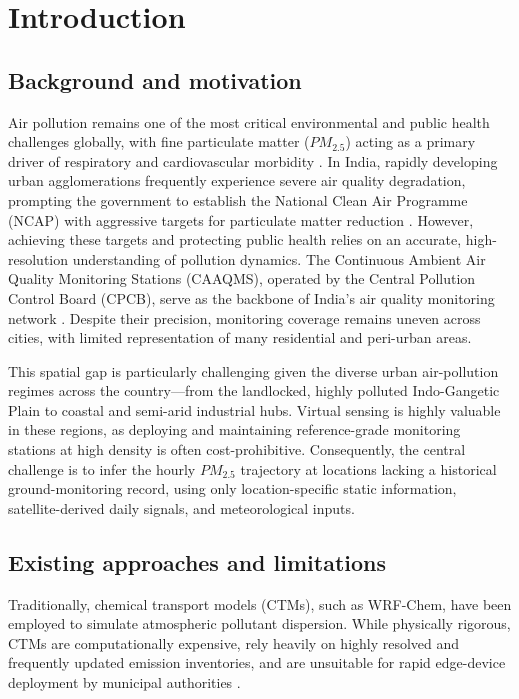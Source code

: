 \section{Introduction}

\subsection{Background and motivation}
Air pollution remains one of the most critical environmental and public health challenges globally, with fine particulate matter ($PM_{2.5}$) acting as a primary driver of respiratory and cardiovascular morbidity \cite{smith2023health, gupta2023india}. In India, rapidly developing urban agglomerations frequently experience severe air quality degradation, prompting the government to establish the National Clean Air Programme (NCAP) with aggressive targets for particulate matter reduction \cite{sharma2023ncap}. However, achieving these targets and protecting public health relies on an accurate, high-resolution understanding of pollution dynamics. The Continuous Ambient Air Quality Monitoring Stations (CAAQMS), operated by the Central Pollution Control Board (CPCB), serve as the backbone of India's air quality monitoring network \cite{kumar2023cpcb}. Despite their precision, monitoring coverage remains uneven across cities, with limited representation of many residential and peri-urban areas. 

This spatial gap is particularly challenging given the diverse urban air-pollution regimes across the country—from the landlocked, highly polluted Indo-Gangetic Plain to coastal and semi-arid industrial hubs. Virtual sensing \cite{das2024virtual} is highly valuable in these regions, as deploying and maintaining reference-grade monitoring stations at high density is often cost-prohibitive. Consequently, the central challenge is to infer the hourly $PM_{2.5}$ trajectory at locations lacking a historical ground-monitoring record, using only location-specific static information, satellite-derived daily signals, and meteorological inputs.

\subsection{Existing approaches and limitations}
Traditionally, chemical transport models (CTMs), such as WRF-Chem, have been employed to simulate atmospheric pollutant dispersion. While physically rigorous, CTMs are computationally expensive, rely heavily on highly resolved and frequently updated emission inventories, and are unsuitable for rapid edge-device deployment by municipal authorities \cite{jones2023wrf}.

